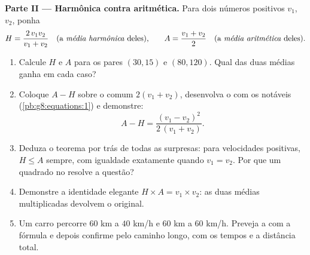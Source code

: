 \begin{problem}
\medskip
\noindent\textbf{Parte II --- Harmônica contra aritmética.}
Para dois números positivos $v_1$, $v_2$, ponha
\[
H = \frac{2\, v_1 v_2}{v_1 + v_2}
\quad\text{(a \emph{média harmônica} deles),}
\qquad
A = \frac{v_1 + v_2}{2}
\quad\text{(a \emph{média aritmética} deles).}
\]
\begin{enumerate}[resume]
  \item Calcule $H$ e $A$ para os pares $(30, 15)$ e $(80, 120)$. Qual
        das duas médias ganha em cada caso?
  \item Coloque $A - H$ sobre o  comum $2(v_1 + v_2)$,
        desenvolva o  com os  notáveis
        (\cref{pb:g8:equations:1}) e demonstre:
        \[
        A - H = \frac{(v_1 - v_2)^2}{2\,(v_1 + v_2)} .
        \]
  \item Deduza o teorema por trás de todas as surpresas: para
        velocidades positivas, $H \leq A$ sempre, com igualdade
        exatamente quando $v_1 = v_2$. Por que um quadrado no 
        resolve a questão?
  \item Demonstre a identidade elegante $H \times A = v_1 \times v_2$:
        as duas médias multiplicadas devolvem o  original.
  \item Um carro percorre $60$ km a $40$ km/h e $60$ km a $60$ km/h.
        Preveja a  com a fórmula e depois confirme pelo
        caminho longo, com os tempos e a distância total.
\end{enumerate}


\end{problem}
